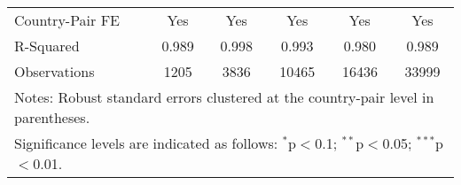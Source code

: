 \begin{table}[htbp]
\begin{adjustbox}{max width=\textwidth}
\begin{tabular}{lccccc}
    Country-Pair FE & Yes & Yes & Yes & Yes & Yes \\
    R-Squared & 0.989 & 0.998 & 0.993 & 0.980 & 0.989 \\
    Observations & 1205 & 3836 & 10465 & 16436 & 33999 \\
    \hline
    \multicolumn{6}{l}{\footnotesize{Notes: Robust standard errors clustered at the country-pair level in parentheses.}} \\
    \multicolumn{6}{l}{\footnotesize{Significance levels are indicated as follows: $^{\ast}$p$<$0.1; $^{\ast\ast}$p$<$0.05; $^{\ast\ast\ast}$p$<$0.01.}} \\
    \end{tabular}
    \end{adjustbox}
\end{table}
